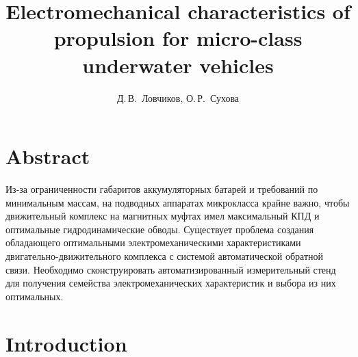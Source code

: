 \documentclass[12pt, twoside]{article}
\title{Electromechanical characteristics of propulsion for micro-class underwater vehicles}
\author{Д.\,В.~Ловчиков, О.\,Р.~Сухова}
\date{}
\begin{document}
\maketitle
\linenumbers
\section{Abstract}
Из-за ограниченности габаритов аккумуляторных батарей и требований по минимальным массам, на подводных аппаратах микрокласса крайне важно, чтобы движительный комплекс на магнитных муфтах имел максимальный КПД и оптимальные гидродинамические обводы. Существует проблема создания обладающего оптимальными электромеханическими характеристиками двигательно-движительного комплекса с системой автоматической обратной связи. Необходимо сконструировать автоматизированный измерительный стенд для получения семейства электромеханических характеристик и выбора из них оптимальных.
\section{Introduction}
\end{document}
